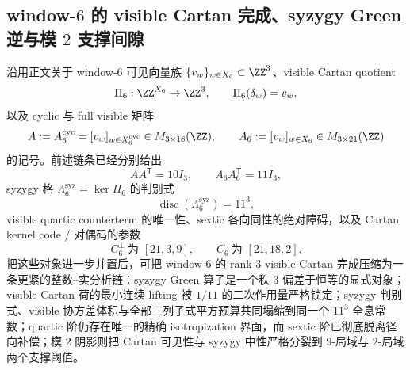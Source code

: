 \subsection{window-\texorpdfstring{$6$}{6} 的 visible Cartan 完成、syzygy Green 逆与模 \texorpdfstring{$2$}{2} 支撑间隙}\label{subsec:conclusion-window6-cartan-syzygy-green-isotropy-codegap}
沿用正文关于 window-\(6\) 可见向量族 \(\{v_w\}_{w\in X_6}\subset \ZZ^3\)、visible Cartan quotient
\[
\Pi_6:\ZZ^{X_6}\to \ZZ^3,
\qquad
\Pi_6(\delta_w)=v_w,
\]
以及 cyclic 与 full visible 矩阵
\[
A:=A_6^{\mathrm{cyc}}=[v_w]_{w\in X_6^{\mathrm{cyc}}}\in M_{3\times 18}(\ZZ),
\qquad
A_6:=[v_w]_{w\in X_6}\in M_{3\times 21}(\ZZ)
\]
的记号。前述链条已经分别给出
\[
AA^{\mathsf T}=10I_3,
\qquad
A_6A_6^{\mathsf T}=11I_3,
\]
syzygy 格 \(\Lambda_6^{\mathrm{syz}}=\ker \Pi_6\) 的判别式
\[
\operatorname{disc}(\Lambda_6^{\mathrm{syz}})=11^3,
\]
visible quartic counterterm 的唯一性、sextic 各向同性的绝对障碍，以及 Cartan kernel code / 对偶码的参数
\[
C_6^\perp\ \text{为 }[21,3,9],
\qquad
C_6\ \text{为 }[21,18,2].
\]
把这些对象进一步并置后，可把 window-\(6\) 的 rank-\(3\) visible Cartan 完成压缩为一条更紧的整数--实分析链：syzygy Green 算子是一个秩 \(3\) 偏差于恒等的显式对象；visible Cartan 荷的最小连续 lifting 被 \(1/11\) 的二次作用量严格锁定；syzygy 判别式、visible 协方差体积与全部三列子式平方预算共同塌缩到同一个 \(11^3\) 全息常数；quartic 阶仍存在唯一的精确 isotropization 界面，而 sextic 阶已彻底脱离径向补偿；模 \(2\) 阴影则把 Cartan 可见性与 syzygy 中性严格分裂到 \(9\)-局域与 \(2\)-局域两个支撑阈值。


